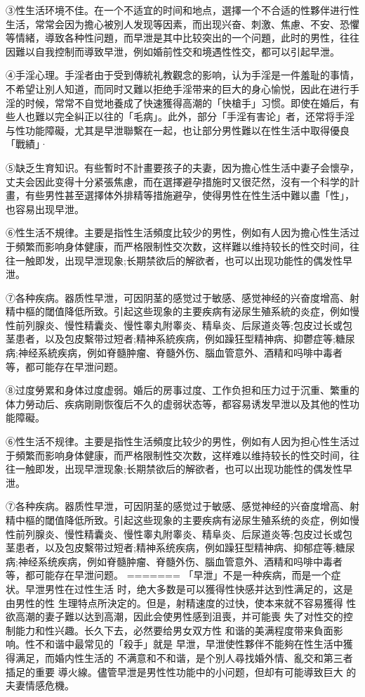 \documentclass[12pt,UTF8]{ctexbook}
\begin{document}
③性生活环境不佳。在一个不适宜的时间和地点，選擇一个不合适的性夥伴进行性生活，常常会因为擔心被別人发现等因素，而出现兴奋、刺激、焦慮、不安、恐懼等情緒，導致各种性问題，而早泄是其中比较突出的一个问題，此时的男性，往往因難以自我控制而導致早泄，例如婚前性交和境遇性性交，都可以引起早泄。

④手淫心理。手淫者由于受到傳統礼教觀念的影响，认为手淫是一件羞耻的事情，不希望让別人知道，而同时又難以拒绝手淫带来的巨大的身心愉悦，因此在进行手淫的时候，常常不自觉地養成了快速獲得高潮的「快槍手」习惯。即使在婚后，有些人也難以完全糾正以往的「毛病」。此外，部分「手淫有害论」者，还常将手淫与性功能障礙，尤其是早泄聯繫在一起，也让部分男性難以在性生活中取得優良「戰績」·

⑤缺乏生育知识。有些暫时不計畫要孩子的夫妻，因为擔心性生活中妻子会懷孕，丈夫会因此变得十分紧張焦慮，而在選擇避孕措施时又很茫然，沒有一个科学的計畫，有些男性甚至選擇体外排精等措施避孕，使得男性在性生活中難以盡「性」，也容易出现早泄。

⑥性生活不規律。主要是指性生活頻度比较少的男性，例如有人因为擔心性生活过于頻繁而影响身体健康，而严格限制性交次数，这样難以维持较长的性交时间，往往一触即发，出现早泄现象;长期禁欲后的解欲者，也可以出现功能性的偶发性早泄。

⑦各种疾病。器质性早泄，可因阴茎的感觉过于敏感、感觉神经的兴奋度增高、射精中樞的閾值降低所致。引起这些现象的主要疾病有泌尿生殖系統的炎症，例如慢性前列腺炎、慢性精囊炎、慢性睾丸附睾炎、精阜炎、后尿道炎等;包皮过长或包茎患者，以及包皮繫带过短者;精神系統疾病，例如躁狂型精神病、抑鬱症等;糖尿病;神经系統疾病，例如脊髓肿瘤、脊髓外伤、腦血管意外、酒精和吗啡中毒者等，都可能存在早泄问题。

⑧过度勞累和身体过度虚弱。婚后的房事过度、工作负担和压力过于沉重、繁重的体力勞动后、疾病剛剛恢復后不久的虚弱状态等，都容易诱发早泄以及其他的性功能障礙。

⑥性生活不规律。主要是指性生活頻度比较少的男性，例如有人因为担心性生活过于頻繁而影响身体健康，而严格限制性交次数，这样难以维持较长的性交时间，往往一触即发，出现早泄现象;长期禁欲后的解欲者，也可以出现功能性的偶发性早泄。

⑦各种疾病。器质性早泄，可因阴茎的感觉过于敏感、感觉神经的兴奋度增高、射精中樞的閾值降低所致。引起这些现象的主要疾病有泌尿生殖系统的炎症，例如慢性前列腺炎、慢性精囊炎、慢性睾丸附睾炎、精阜炎、后尿道炎等;包皮过长或包茎患者，以及包皮繫带过短者;精神系统疾病，例如躁狂型精神病、抑郁症等;糖尿病;神经系统疾病，例如脊髓肿瘤、脊髓外伤、腦血管意外、酒精和吗啡中毒者等，都可能存在早泄问题。
=======
「早泄」不是一种疾病，而是一个症状。早泄男性在过性生活
时，绝大多数是可以獲得性快感并达到性满足的，这是由男性的性
生理特点所決定的。但是，射精速度的过快，使本来就不容易獲得
性欲高潮的妻子難以达到高潮，因此会使男性感到沮喪，并可能喪
失了对性交的控制能力和性兴趣。长久下去，必然要给男女双方性
和谐的美满程度带来負面影响。性不和谐中最常见的「殺手」就是
早泄，早泄使性夥伴不能夠在性生活中獲得满足，而婚内性生活的
不满意和不和谐，是个別人尋找婚外情、亂交和第三者插足的重要
導火線。儘管早泄是男性性功能中的小问题，但却有可能導致巨大
的夫妻情感危機。
\end{document}
